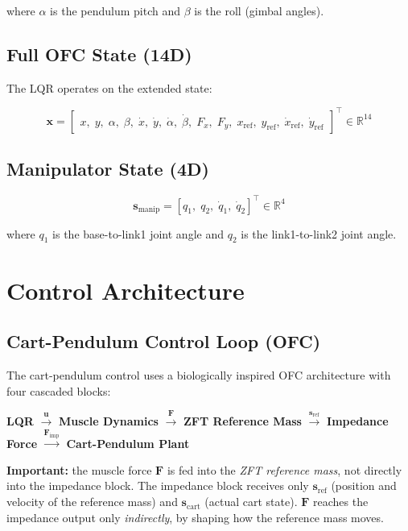 \documentclass[11pt, a4paper]{article}
\begin{document}
where $\alpha$ is the pendulum pitch and $\beta$ is the roll (gimbal angles).

\subsection{Full OFC State (14D)}

The LQR operates on the extended state:

\[
\bm{x} =
\begin{bmatrix}
x,\; y,\; \alpha,\; \beta,\;
\dot{x},\; \dot{y},\; \dot{\alpha},\; \dot{\beta},\;
F_x,\; F_y,\;
x_{\mathrm{ref}},\; y_{\mathrm{ref}},\;
\dot{x}_{\mathrm{ref}},\; \dot{y}_{\mathrm{ref}}
\end{bmatrix}^{\top} \in \mathbb{R}^{14}
\]

\subsection{Manipulator State (4D)}

\[
\bm{s}_{\text{manip}} =
[q_1,\; q_2,\; \dot{q}_1,\; \dot{q}_2]^{\top} \in \mathbb{R}^{4}
\]

where $q_1$ is the base-to-link1 joint angle and $q_2$ is the link1-to-link2
joint angle.

\section{Control Architecture}

\subsection{Cart-Pendulum Control Loop (OFC)}

The cart-pendulum control uses a biologically inspired OFC architecture with
four cascaded blocks:

\begin{center}
\textbf{LQR} $\xrightarrow{\bm{u}}$
\textbf{Muscle Dynamics} $\xrightarrow{\bm{F}}$
\textbf{ZFT Reference Mass} $\xrightarrow{\bm{s}_{\mathrm{ref}}}$
\textbf{Impedance Force} $\xrightarrow{\bm{F}_{\mathrm{imp}}}$
\textbf{Cart-Pendulum Plant}
\end{center}

\noindent\textbf{Important:} the muscle force $\bm{F}$ is fed into the
\emph{ZFT reference mass}, not directly into the impedance block.
The impedance block receives only $\bm{s}_{\mathrm{ref}}$ (position and
velocity of the reference mass) and $\bm{s}_{\mathrm{cart}}$ (actual cart
state). $\bm{F}$ reaches the impedance output only \emph{indirectly}, by
shaping how the reference mass moves.
\end{document}
